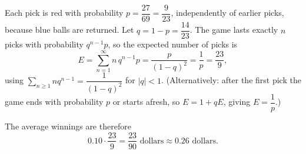 Each pick is red with probability $p=\dfrac{27}{69}=\dfrac{9}{23}$, independently of earlier picks, because blue balls are returned. Let $q=1-p=\dfrac{14}{23}$. The game lasts exactly $n$ picks with probability $q^{n-1}p$, so the expected number of picks is
\[E=\sum_{n=1}^{\infty}n\,q^{n-1}p=\dfrac{p}{(1-q)^2}=\dfrac1p=\dfrac{23}{9},\]
using $\displaystyle\sum_{n\ge1}nq^{n-1}=\dfrac{1}{(1-q)^2}$ for $|q|<1$. (Alternatively: after the first pick the game ends with probability $p$ or starts afresh, so $E=1+qE$, giving $E=\dfrac1p$.)

The average winnings are therefore
\[0.10\cdot\dfrac{23}{9}=\boxed{\dfrac{23}{90}\text{ dollars}}\approx0.26\text{ dollars}.\]
